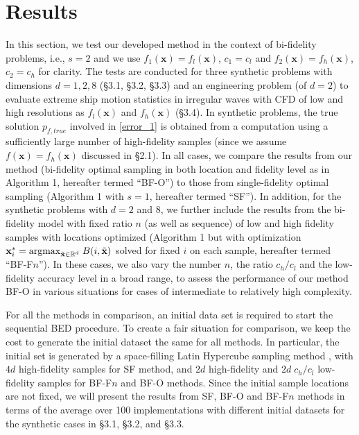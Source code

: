 \documentclass[11pt]{article}
\begin{document}
\section{Results}

In this section, we test our developed method in the context of bi-fidelity problems, i.e., $s=2$ and we use $f_1(\mathbf{x})=f_l(\mathbf{x})$, $c_1=c_l$ and $f_2(\mathbf{x})=f_h(\mathbf{x})$, $c_2=c_h$ for clarity. The tests are conducted for three synthetic problems with dimensions $d=1, 2, 8$ (\S3.1, \S3.2, \S3.3) and an engineering problem (of $d=2$) to evaluate extreme ship motion statistics in irregular waves with CFD of low and high resolutions as $f_l(\mathbf{x})$ and $f_h(\mathbf{x})$ (\S3.4). In synthetic problems, the true solution $p_{f,true}$ involved in \eqref{error_1} is obtained from a computation using a sufficiently large number of high-fidelity samples (since we assume $f(\mathbf{x})=f_h(\mathbf{x})$ discussed in \S2.1). In all cases, we compare the results from our method (bi-fidelity optimal sampling in both location and fidelity level as in Algorithm 1, hereafter termed ``BF-O'') to those from single-fidelity optimal sampling \cite{blanchard2021output} (Algorithm 1 with $s=1$, hereafter termed ``SF''). In addition, for the synthetic problems with $d=2$ and $8$, we further include the results from the bi-fidelity model with fixed ratio $n$ (as well as sequence) of low and high fidelity samples with locations optimized (Algorithm 1 but with optimization $\mathbf{x}_i^*= {\rm{argmax}}_{\tilde{\mathbf{x}} \in  \mathbb{R}^{d}} \; B(i,\tilde{\mathbf{x}})$ solved for fixed $i$ on each sample, hereafter termed ``BF-F$n$''). In these cases, we also vary the number $n$, the ratio $c_h/c_l$ and the low-fidelity accuracy level in a broad range, to assess the performance of our method BF-O in various situations for cases of intermediate to relatively high complexity.  

For all the methods in comparison, an initial data set is required to start the sequential BED procedure. To create a fair situation for comparison, we keep the cost to generate the initial dataset the same for all methods. In particular, the initial set is generated by a space-filling Latin Hypercube sampling method \cite{mckay2000comparison}, with $4d$ high-fidelity samples for SF method, and $2d$ high-fidelity and $2d \; c_h/c_l$ low-fidelity samples for BF-F$n$ and BF-O methods. Since the initial sample locations are not fixed, we will present the results from SF, BF-O and BF-F$n$ methods in terms of the average over 100 implementations with different initial datasets for the synthetic cases in \S3.1, \S3.2, and \S3.3.
\end{document}

